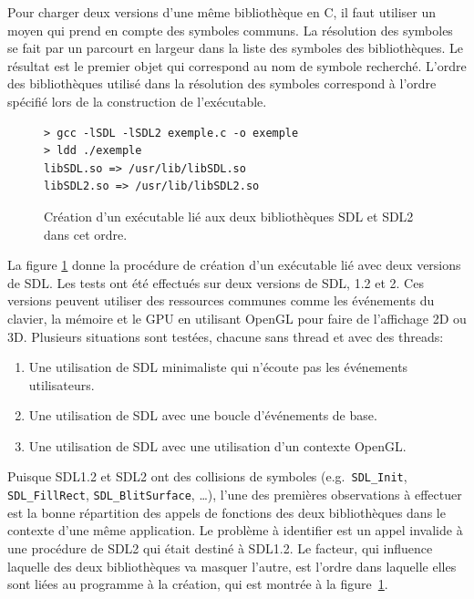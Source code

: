 Pour charger deux versions d'une même bibliothèque en C, il faut utiliser un
moyen qui prend en compte des symboles communs.  La résolution des symboles se
fait par un parcourt en largeur dans la liste des symboles des bibliothèques.
Le résultat est le premier objet qui correspond au nom de symbole recherché.
L'ordre des bibliothèques utilisé dans la résolution des symboles correspond à
l'ordre spécifié lors de la construction de l'exécutable.

\begin{center}
\begin{figure}[ht]
\begin{lstlisting}[frame=single]
> gcc -lSDL -lSDL2 exemple.c -o exemple
> ldd ./exemple
libSDL.so => /usr/lib/libSDL.so
libSDL2.so => /usr/lib/libSDL2.so
\end{lstlisting}
\caption{Création d'un exécutable lié aux deux bibliothèques
SDL et SDL2 dans cet ordre.}
\label{fig:sdl_mask_sdl2}
\end{figure}
\end{center}

La figure \ref{fig:sdl_mask_sdl2} donne la procédure de création d'un
exécutable lié avec deux versions de SDL.  Les tests ont été effectués sur deux
versions de SDL, 1.2 et 2. Ces versions peuvent utiliser des ressources communes comme
les événements du clavier, la mémoire et le GPU en utilisant OpenGL pour faire
de l'affichage 2D ou 3D.  Plusieurs situations sont testées, chacune sans thread
et avec des threads:
%
\begin{enumerate}
    \item Une utilisation de SDL minimaliste qui n'écoute pas les événements utilisateurs.
    \item Une utilisation de SDL avec une boucle d'événements de base.
    \item Une utilisation de SDL avec une utilisation d'un contexte OpenGL.
\end{enumerate}

Puisque SDL1.2 et SDL2 ont des collisions de symboles (e.g.\ \verb+SDL_Init+,
\verb+SDL_FillRect+, \verb+SDL_BlitSurface+, \dots), l'une des premières
observations à effectuer est la bonne répartition des appels de fonctions des
deux bibliothèques dans le contexte d'une même application. Le problème à
identifier est un appel invalide à une procédure de SDL2 qui était destiné à
SDL1.2. Le facteur, qui influence laquelle des deux bibliothèques va masquer
l'autre, est l'ordre dans laquelle elles sont liées au programme à la création,
qui est montrée à la figure~\ref{fig:sdl_mask_sdl2}.

